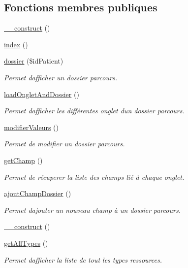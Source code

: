 \subsection*{Fonctions membres publiques}
\begin{DoxyCompactItemize}
\item 
\hyperlink{class_dossier_parcours_a7e8fcd3dc296c8c43c8e11bcc0c681fe}{\+\_\+\+\_\+construct} ()
\item 
\hyperlink{class_dossier_parcours_a178d2bbd390067f69fff4313dec1c0eb}{index} ()
\item 
\hyperlink{class_dossier_parcours_a0eddbe2795e708c6173bbdc089e7b8a5}{dossier} (\$id\+Patient)
\begin{DoxyCompactList}\small\item\em Permet d\textquotesingle{}afficher un dossier parcours. \end{DoxyCompactList}\item 
\hyperlink{class_dossier_parcours_aa59c63d44b200a14541461a4c9f1746f}{load\+Onglet\+And\+Dossier} ()
\begin{DoxyCompactList}\small\item\em Permet d\textquotesingle{}afficher les différentes onglet d\textquotesingle{}un dossier parcours. \end{DoxyCompactList}\item 
\hyperlink{class_dossier_parcours_a0749c88d27af59e143da827f8f1266d8}{modifier\+Valeurs} ()
\begin{DoxyCompactList}\small\item\em Permet de modifier un dossier parcours. \end{DoxyCompactList}\item 
\hyperlink{class_dossier_parcours_aa85c6e4f4f0c615a0a51d3b94574aba2}{get\+Champ} ()
\begin{DoxyCompactList}\small\item\em Permet de récuperer la liste des champs lié à chaque onglet. \end{DoxyCompactList}\item 
\hyperlink{class_dossier_parcours_ac84534aba91f22e62a9d9b7543892828}{ajout\+Champ\+Dossier} ()
\begin{DoxyCompactList}\small\item\em Permet d\textquotesingle{}ajouter un nouveau champ à un dossier parcours. \end{DoxyCompactList}\item 
\hyperlink{class_dossier_parcours_a7e8fcd3dc296c8c43c8e11bcc0c681fe}{\+\_\+\+\_\+construct} ()
\item 
\hyperlink{class_dossier_parcours_aae7bd65f5931b1985a6bca486e430732}{get\+All\+Types} ()
\begin{DoxyCompactList}\small\item\em Permet d\textquotesingle{}afficher la liste de tout les types ressources. \end{DoxyCompactList}\end{DoxyCompactItemize}


